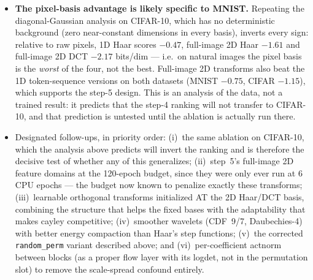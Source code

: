 \documentclass[11pt]{article}
\begin{document}
\begin{itemize}
        structured bases (Haar/DCT/Hadamard/Hartley) and the near-identity
        cayley all sample cleanly. TarFlow's reverse is sequential, so
        inversion error compounds across the chain; a good forward density
        does not imply a usable sampler. \emph{Rendering caveat:} the grids
        are written with \texttt{normalize=True} and no explicit
        \texttt{value\_range}, so each is contrast-stretched by its own
        min/max. Shape and texture are comparable across variants;
        brightness and contrast are not. Both should be fixed by passing
        \texttt{value\_range=(-1,1)} and by checkpointing weights so grids
        can be re-rendered without retraining.
  \item \textbf{The pixel-basis advantage is likely specific to MNIST.}
        Repeating the diagonal-Gaussian analysis on CIFAR-10, which has no
        deterministic background (zero near-constant dimensions in every
        basis), inverts every sign: relative to raw pixels, 1D Haar scores
        $-0.47$, full-image 2D Haar $-1.61$ and full-image 2D DCT $-2.17$
        bits/dim --- i.e.\ on natural images the pixel basis is the
        \emph{worst} of the four, not the best. Full-image 2D transforms
        also beat the 1D token-sequence versions on both datasets (MNIST
        $-0.75$, CIFAR $-1.15$), which supports the step-5 design. This is
        an analysis of the data, not a trained result: it predicts that the
        step-4 ranking will not transfer to CIFAR-10, and that prediction is
        untested until the ablation is actually run there.
  \item Designated follow-ups, in priority order: (i)~the same ablation on
        CIFAR-10, which the analysis above predicts will invert the ranking
        and is therefore the decisive test of whether any of this
        generalizes; (ii)~step~5's full-image 2D feature domains at the
        120-epoch budget, since they were only ever run at 6 CPU epochs ---
        the budget now known to penalize exactly these transforms;
        (iii)~learnable orthogonal transforms initialized AT the 2D Haar/DCT
        basis, combining the structure that helps the fixed bases with the
        adaptability that makes cayley competitive; (iv)~smoother wavelets
        (CDF~9/7, Daubechies-4) with better energy compaction than Haar's
        step functions; (v)~the corrected \texttt{random\_perm} variant
        described above; and (vi)~per-coefficient actnorm between blocks
        (as a proper flow layer with its logdet, not in the permutation
        slot) to remove the scale-spread confound entirely.
\end{itemize}
\end{document}
